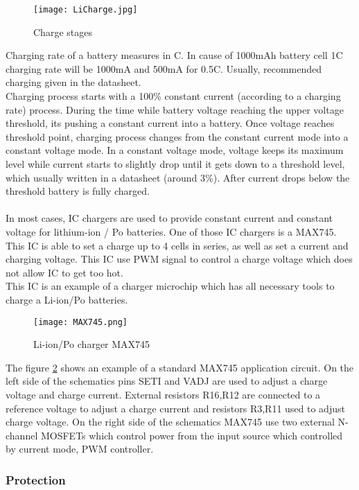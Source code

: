 \begin{figure}[h]
	\centering
	\texttt{[image: LiCharge.jpg]}
	\caption{ Charge stages \cite{14}}
	\label{fig: EPS}
\end{figure}
 Charging rate of a battery measures in C. In cause of 1000mAh battery cell 1C charging rate will be 1000mA and 500mA for 0.5C. Usually, recommended charging given in the datasheet.\\
 Charging process starts with a 100\%  constant current (according to a charging rate) process. During the time while battery voltage reaching the upper voltage threshold, its pushing a constant current into a battery. Once voltage reaches threshold point, charging process changes from the constant current mode into a constant voltage mode. In a constant voltage mode, voltage keeps its maximum level while current starts to slightly drop until it gets down to a threshold level, which usually written in a datasheet (around 3\%). After current drops below the threshold battery is fully charged. \\ \\
 In most cases, IC chargers are used to provide constant current and constant voltage for lithium-ion / Po batteries. \cite{14} One of those IC chargers is a MAX745. 
This IC is able to set a charge up to 4 cells in series, as well as set a current and charging voltage. This IC use PWM signal to control a charge voltage which does not allow IC to get too hot.\\ This IC is an example of a charger microchip which has all necessary  tools to charge a Li-ion/Po batteries. 



\begin{figure}[h]
	\centering
	\texttt{[image: MAX745.png]}
	\caption{ Li-ion/Po charger MAX745 \cite{15}}
	\label{fig: EPS}
\end{figure}

The figure \ref{fig: EPS} shows an example of a standard MAX745 application circuit. On the left side of the schematics pins SETI and VADJ are used to adjust a charge voltage and charge current. External resistors R16,R12 are connected to a reference voltage to adjust a charge current and resistors R3,R11  used to adjust charge voltage. On the right side of the schematics MAX745 use two external N-channel MOSFETs which control power from the input source which controlled by current mode, PWM controller. 



\subsubsection{Protection}

